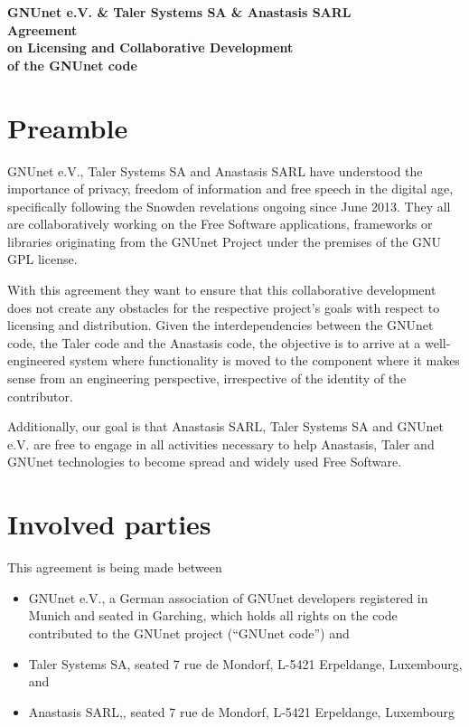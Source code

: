 \documentclass[12pt, a4paper, bibliography=totocnumbered]{article}
\begin{document}
\begin{center}
\Large{\textbf{GNUnet e.V. \& Taler Systems SA \& Anastasis SARL \\ Agreement\\ on Licensing and Collaborative Development \\ of the GNUnet code}}\\
\end{center}
\normalsize
\section*{Preamble}
GNUnet e.V., Taler Systems SA and Anastasis SARL have understood
the importance of privacy, freedom of information and free speech in
the digital age, specifically following the Snowden revelations ongoing since
June 2013. They all are collaboratively working on the Free Software
applications, frameworks or libraries originating from the GNUnet Project
under the premises of the GNU GPL license.

With this agreement they want to ensure that this collaborative
development does not create any obstacles for the respective project's
goals with respect to licensing and distribution.  Given the
interdependencies between the GNUnet code, the Taler code and the
Anastasis code, the objective is to arrive at a well-engineered system
where functionality is moved to the component where it makes sense
from an engineering perspective, irrespective of the identity of the
contributor.

Additionally, our goal is that Anastasis SARL, Taler Systems SA and
GNUnet e.V.  are free to engage in all activities necessary to help
Anastasis, Taler and GNUnet technologies to become spread and widely
used Free Software.

\section*{Involved parties}
This agreement is being made between
\begin{itemize}
\item GNUnet e.V., a German association of GNUnet developers registered in Munich and seated in Garching, which holds all rights on the code contributed to the GNUnet project (``GNUnet code'') and
\item Taler Systems SA, seated 7 rue de Mondorf, L-5421 Erpeldange, Luxembourg, and
\item Anastasis SARL,, seated 7 rue de Mondorf, L-5421 Erpeldange, Luxembourg
\end{itemize}
\end{document}
